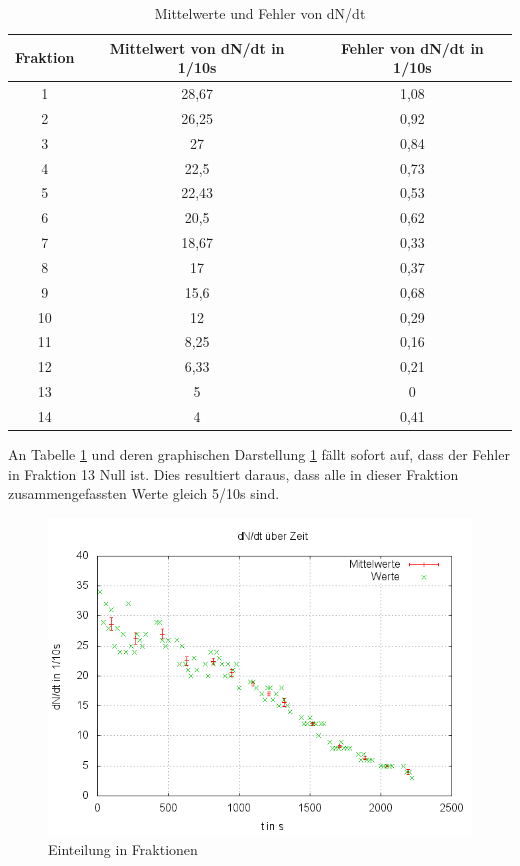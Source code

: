 \begin{table}
\centering
\begin{tabular}{ccc}

Fraktion	&Mittelwert von dN/dt in 1/10s	&Fehler von dN/dt in 1/10s \\
\toprule
1		&28,67				&1,08\\

2		&26,25				&0,92\\

3		&27					&0,84\\

4		&22,5				&0,73\\

5		&22,43				&0,53\\

6		&20,5				&0,62\\

7		&18,67				&0,33\\

8		&17					&0,37\\

9		&15,6				&0,68\\

10		&12					&0,29\\

11		&8,25				&0,16\\

12		&6,33				&0,21\\

13		&5					&0\\

14		&4					&0,41\\

\end{tabular}
\caption{Mittelwerte und Fehler von dN/dt}
\label{tbl_3}
\end{table}


An Tabelle \ref{tbl_3} und deren graphischen Darstellung \ref{dNdt(t)MWmitaltenWerten} fällt sofort auf, dass 
der Fehler in Fraktion 13 Null ist. Dies resultiert daraus, dass alle in dieser Fraktion zusammengefassten Werte 
gleich 5/10s sind. 


\begin{figure}
\centering
        \includegraphics[width=.8\textwidth]{images/dNdt(t)MWmitaltenWerten.png}
\caption{Einteilung in Fraktionen}
\label{dNdt(t)MWmitaltenWerten}
\end{figure}


